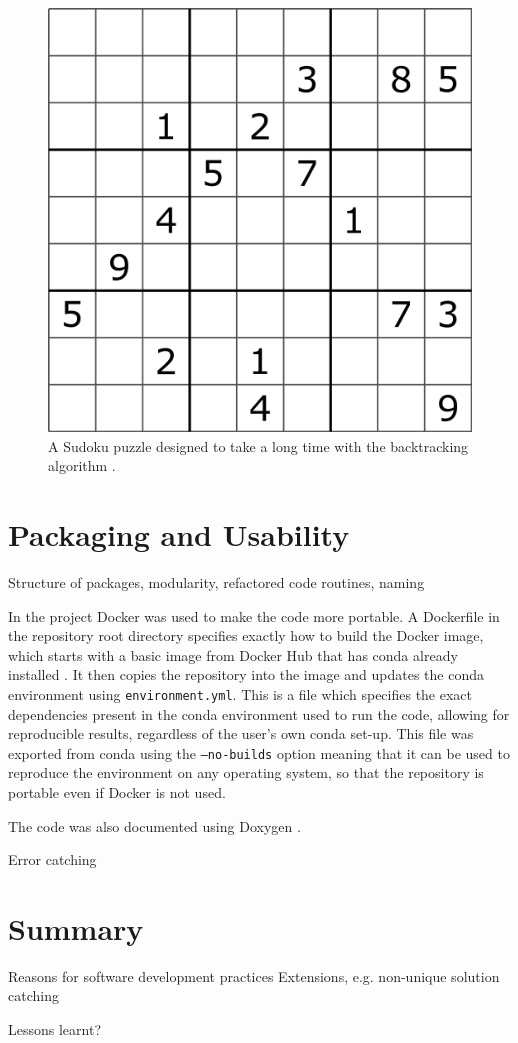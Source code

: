 \documentclass[12pt]{article}
\begin{document}
\begin{figure}[hbt]
    \includegraphics[scale=0.3]{Sudoku_puzzle_hard_for_brute_force.png}
    \caption{A Sudoku puzzle designed to take a long time with the backtracking algorithm \cite{antagonist}.}
    \label{antagonist_clues}
\end{figure}

\section*{Packaging and Usability}

Structure of packages, modularity, refactored code routines, naming

In the project Docker was used to make the code more portable.
A Dockerfile in the repository root directory specifies exactly how to build the Docker image, which starts with a basic image from Docker Hub that has conda already installed \cite{docker}.
It then copies the repository into the image and updates the conda environment using \texttt{environment.yml}.
This is a file which specifies the exact dependencies present in the conda environment used to run the code, allowing for reproducible results, regardless of the user's own conda set-up.
This file was exported from conda using the \texttt{--no-builds} option meaning that it can be used to reproduce the environment on any operating system, so that the repository is portable even if Docker is not used.

The code was also documented using Doxygen \cite{doxygen}.

Error catching

\section*{Summary}

Reasons for software development practices
Extensions, e.g. non-unique solution catching

Lessons learnt?


\end{document}
